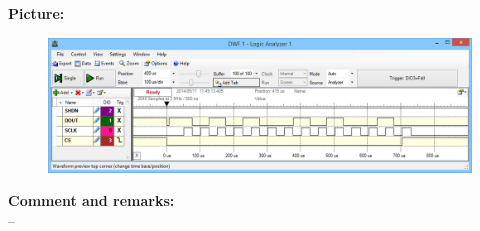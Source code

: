 \textbf{Picture:}
\begin{figure}[H]
	\centering
	\includegraphics[width=.9\textwidth]{billeder/ADC_interfacing}
\end{figure}

\textbf{Comment and remarks:}\\
--\\